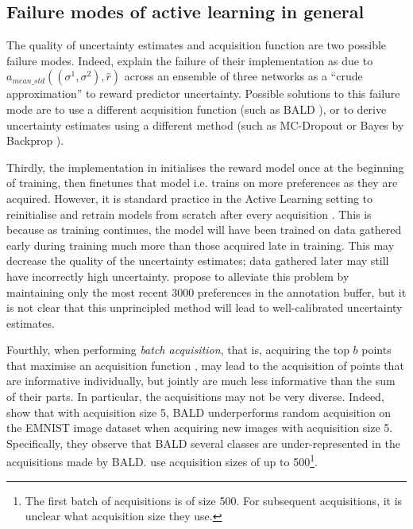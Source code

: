 \documentclass[11pt, a4paper, bibliography=totoc]{report}
\newcommand{\rp}{\hat{r}}
\begin{document}
\subsection{Failure modes of active learning in general}
The quality of uncertainty estimates and acquisition function are two possible failure modes. Indeed, \cite[p.~6]{Christiano2017} explain the failure of their implementation as due to $ a_{mean\_std}((\sigma^1, \sigma^2), \rp) $ across an ensemble of three networks as a ``crude approximation'' to reward predictor uncertainty. Possible solutions to this failure mode are to use a different acquisition function (such as BALD \cite{Houlsby2011}), or to derive uncertainty estimates using a different method (such as MC-Dropout \cite{Gal2015} or Bayes by Backprop \cite{Blundell2015}).

Thirdly, the implementation in \cite{Christiano2017} initialises the reward model once at the beginning of training, then finetunes that model i.e. trains on more preferences as they are acquired. However, it is standard practice in the Active Learning setting to reinitialise and retrain models from scratch after every acquisition \cite[p.~3]{Kirsch2019a}. This is because as training continues, the model will have been trained on data gathered early during training much more than those acquired late in training. This may decrease the quality of the uncertainty estimates; data gathered later may still have incorrectly high uncertainty. \cite{Christiano2017} propose to alleviate this problem by maintaining only the most recent 3000 preferences in the annotation buffer, but it is not clear that this unprincipled method will lead to well-calibrated uncertainty estimates.

Fourthly, when performing \textit{batch acquisition}, that is, acquiring the top $ b $ points that maximise an acquisition function \cite{Gal2017b}, may lead to the acquisition of points that are informative individually, but jointly are much less informative than the sum of their parts. In particular, the acquisitions may not be very diverse. Indeed, \cite[p.~8]{Kirsch2019a} show that with acquisition size 5, BALD underperforms random acquisition on the EMNIST image dataset \cite{cohen2017emnist} when acquiring new images with acquisition size 5. Specifically, they observe that BALD several classes are under-represented in the acquisitions made by BALD. \cite{Christiano2017} use acquisition sizes of up to 500\footnote{The first batch of acquisitions is of size 500. For subsequent acquisitions, it is unclear what acquisition size they use.}.
\end{document}
